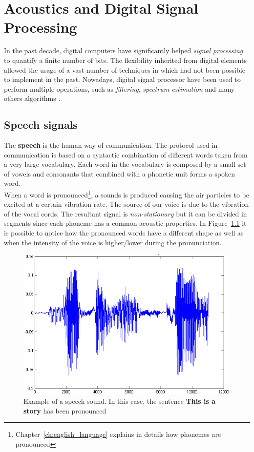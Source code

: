 \chapter{Acoustics and Digital Signal Processing}
\label{ch:speech analysis}
In the past decade, digital computers have significantly helped \textit{signal processing} to quantify a finite number of bits. The flexibility inherited from digital elements allowed the usage of a vast number of techniques in which had not been possible to implement in the past. Nowadays, digital signal processor have been used to perform multiple operations, such as \textit{filtering}, \textit{spectrum estimation} and many others algorithms \cite{orfanidis1995introduction}.


\section{Speech signals}
\label{sec:speech_signals}
The \textbf{speech} is the human way of communication. The protocol used in communication is based on a syntactic combination of different words taken from a very large vocabulary. Each word in the vocabulary is composed by a small set of vowels and consonants that combined with a phonetic unit forms a spoken word. \\
\noindent When a word is pronounced\footnote{Chapter~\ref{ch:english_language} explains in details how phonemes are pronounced}, a sounds is produced causing the air particles to be excited at a certain vibration rate. The source of our voice is due to the vibration of the vocal cords. The resultant signal is \textit{non-stationary} but it can be divided in segments since each phoneme has a common acoustic properties. In Figure~\ref{fig:ex_sound_wave} it is possible to notice how the pronounced words have a different shape as well as when the intensity of the voice is higher/lower during the pronunciation.

\begin{figure}[!ht]
	\centering
	\includegraphics[scale=0.4]{Figures/ex_speech.png}
	\caption{Example of a speech sound. In this case, the sentence \textbf{This is a story} has been pronounced \cite{ex_speech_image}}
	\label{fig:ex_sound_wave}
\end{figure}

